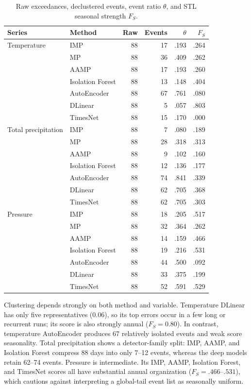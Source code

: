 \documentclass[11pt,a4paper]{article}
\begin{document}
\begin{table}[ht]
\centering
\caption{Raw exceedances, declustered events, event ratio $\theta$, and STL
seasonal strength $F_S$.}
\label{tab:peaks}
\small
\begin{tabular}{llrrrr}
\toprule
Series & Method & Raw & Events & $\theta$ & $F_S$\\
\midrule
Temperature & IMP         & 88 & 17 & .193 & .264\\
            & MP          & 88 & 36 & .409 & .262\\
            & AAMP        & 88 & 17 & .193 & .260\\
            & Isolation Forest & 88 & 13 & .148 & .404\\
            & AutoEncoder & 88 & 67 & .761 & .080\\
            & DLinear     & 88 &  5 & .057 & .803\\
            & TimesNet    & 88 & 15 & .170 & .000\\
\midrule
Total precipitation & IMP         & 88 &  7 & .080 & .189\\
              & MP          & 88 & 28 & .318 & .313\\
              & AAMP        & 88 &  9 & .102 & .160\\
              & Isolation Forest & 88 & 12 & .136 & .177\\
              & AutoEncoder & 88 & 74 & .841 & .339\\
              & DLinear     & 88 & 62 & .705 & .368\\
              & TimesNet    & 88 & 62 & .705 & .303\\
\midrule
Pressure & IMP         & 88 & 18 & .205 & .517\\
         & MP          & 88 & 32 & .364 & .262\\
         & AAMP        & 88 & 14 & .159 & .466\\
         & Isolation Forest & 88 & 19 & .216 & .531\\
         & AutoEncoder & 88 & 44 & .500 & .092\\
         & DLinear     & 88 & 33 & .375 & .199\\
         & TimesNet    & 88 & 52 & .591 & .529\\
\bottomrule
\end{tabular}
\end{table}

Clustering depends strongly on both method and variable. Temperature DLinear
has only five representatives ($0.06$), so its top errors occur in a few
long or recurrent runs; its score is also strongly annual ($F_S=0.80$). In
contrast, temperature AutoEncoder produces 67 relatively isolated events and
weak score seasonality. Total precipitation shows a detector-family split: IMP,
AAMP, and Isolation Forest compress 88 days into only 7--12 events, whereas the
deep models retain 62--74 events. Pressure is intermediate. Its IMP, AAMP,
Isolation Forest, and TimesNet scores all have substantial annual organization
($F_S=.466$--$.531$), which cautions against interpreting a global-tail event
list as seasonally uniform.
\end{document}
